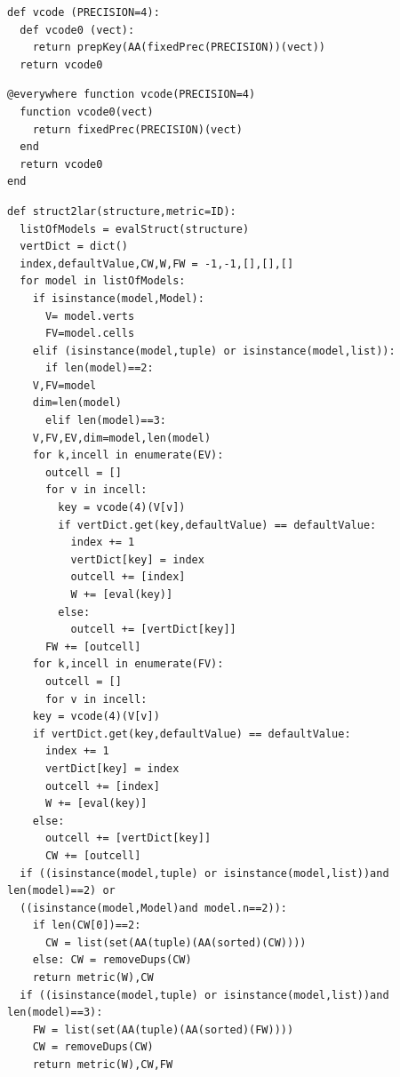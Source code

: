 \documentclass[a4paper,12pt]{article}
\begin{document}
\noindent {}
\begin{multicols}{2}
\noindent {}
\begin{Verbatim}[fontsize=\scriptsize]
def vcode (PRECISION=4):
  def vcode0 (vect):
    return prepKey(AA(fixedPrec(PRECISION))(vect))
  return vcode0  
\end{Verbatim}
\columnbreak
{}
\begin{Verbatim}[fontsize=\scriptsize]
@everywhere function vcode(PRECISION=4)
  function vcode0(vect)
    return fixedPrec(PRECISION)(vect)
  end
  return vcode0
end
\end{Verbatim}
\end{multicols}
\noindent {}
\begin{Verbatim}[fontsize=\footnotesize]
def struct2lar(structure,metric=ID):
  listOfModels = evalStruct(structure)
  vertDict = dict()
  index,defaultValue,CW,W,FW = -1,-1,[],[],[]
  for model in listOfModels:
    if isinstance(model,Model):
      V= model.verts
      FV=model.cells
    elif (isinstance(model,tuple) or isinstance(model,list)):
      if len(model)==2:
	V,FV=model
	dim=len(model)
      elif len(model)==3: 
	V,FV,EV,dim=model,len(model)
	for k,incell in enumerate(EV):
	  outcell = []
	  for v in incell:
	    key = vcode(4)(V[v])
	    if vertDict.get(key,defaultValue) == defaultValue:
	      index += 1
	      vertDict[key] = index
	      outcell += [index]
	      W += [eval(key)]
	    else: 
	      outcell += [vertDict[key]]
	  FW += [outcell]
    for k,incell in enumerate(FV):
      outcell = []
      for v in incell:
	key = vcode(4)(V[v])
	if vertDict.get(key,defaultValue) == defaultValue:
	  index += 1
	  vertDict[key] = index
	  outcell += [index]
	  W += [eval(key)]
	else: 
	  outcell += [vertDict[key]]
      CW += [outcell]
  if ((isinstance(model,tuple) or isinstance(model,list))and len(model)==2) or 
  ((isinstance(model,Model)and model.n==2)):
    if len(CW[0])==2:
      CW = list(set(AA(tuple)(AA(sorted)(CW))))
    else: CW = removeDups(CW)
    return metric(W),CW
  if ((isinstance(model,tuple) or isinstance(model,list))and len(model)==3):
    FW = list(set(AA(tuple)(AA(sorted)(FW))))
    CW = removeDups(CW)
    return metric(W),CW,FW
\end{Verbatim}
\noindent {}
\end{document}
